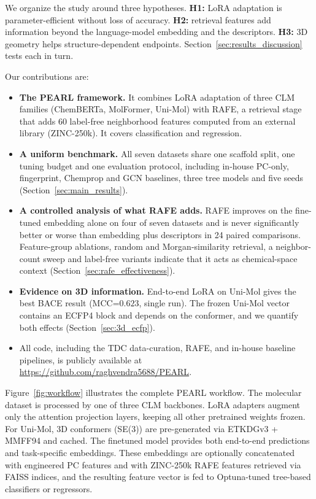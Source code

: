 \documentclass[pdflatex,sn-mathphys-num,Numbered]{sn-jnl}%
\begin{document}
We organize the study around three hypotheses. \textbf{H1:} LoRA adaptation is parameter-efficient without loss of accuracy. \textbf{H2:} retrieval features add information beyond the language-model embedding and the descriptors. \textbf{H3:} 3D geometry helps structure-dependent endpoints. Section~\ref{sec:results_discussion} tests each in turn.

Our contributions are:
\begin{itemize}
  \item \textbf{The PEARL framework.} It combines LoRA adaptation of three CLM families (ChemBERTa, MolFormer, Uni-Mol) with RAFE, a retrieval stage that adds 60 label-free neighborhood features computed from an external library (ZINC-250k). It covers classification and regression.
  \item \textbf{A uniform benchmark.} All seven datasets share one scaffold split, one tuning budget and one evaluation protocol, including in-house PC-only, fingerprint, Chemprop and GCN baselines, three tree models and five seeds (Section~\ref{sec:main_results}).
  \item \textbf{A controlled analysis of what RAFE adds.} RAFE improves on the fine-tuned embedding alone on four of seven datasets and is never significantly better or worse than embedding plus descriptors in 24 paired comparisons. Feature-group ablations, random and Morgan-similarity retrieval, a neighbor-count sweep and label-free variants indicate that it acts as chemical-space context (Section~\ref{sec:rafe_effectiveness}).
  \item \textbf{Evidence on 3D information.} End-to-end LoRA on Uni-Mol gives the best BACE result (MCC=$0.623$, single run). The frozen Uni-Mol vector contains an ECFP4 block and depends on the conformer, and we quantify both effects (Section~\ref{sec:3d_ecfp}).
  \item All code, including the TDC data-curation, RAFE, and in-house baseline pipelines, is publicly available at \url{https://github.com/raghvendra5688/PEARL}.
\end{itemize}

Figure~\ref{fig:workflow} illustrates the complete PEARL workflow. The molecular dataset is processed by one of three CLM backbones. LoRA adapters augment only the attention projection layers, keeping all other pretrained weights frozen. For Uni-Mol, 3D conformers (SE(3)) are pre-generated via ETKDGv3 + MMFF94 and cached. The finetuned model provides both end-to-end predictions and task-specific embeddings. These embeddings are optionally concatenated with engineered PC features and with ZINC-250k RAFE features retrieved via FAISS indices, and the resulting feature vector is fed to Optuna-tuned tree-based classifiers or regressors.
\end{document}
